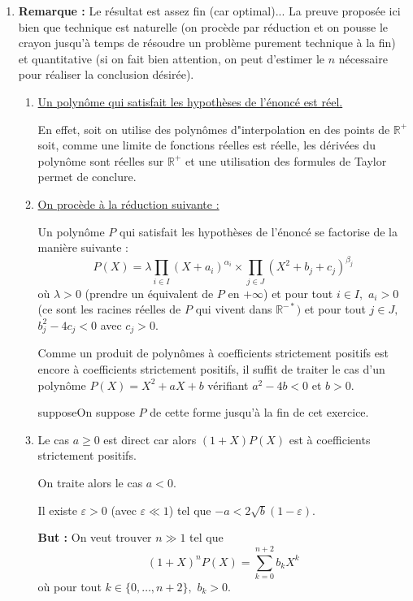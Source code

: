 \begin{enumerate}
 
\item \textbf{Remarque :} Le résultat est assez fin (car optimal)... La preuve proposée ici bien que technique est naturelle (on procède par réduction et on pousse le crayon jusqu'à temps de résoudre un problème purement technique à la fin) et quantitative (si on fait bien attention, on peut d'estimer le $n$ nécessaire pour réaliser la conclusion désirée).\\

\begin{enumerate}
\item \underline{Un polynôme qui satisfait les hypothèses de l'énoncé est réel.}
    
En effet, soit on utilise des polynômes d"interpolation en des points de $\mathbb{R}^{+}$ soit, comme une limite de fonctions réelles est réelle, les dérivées du polynôme sont réelles sur $\mathbb{R}^{+}$ et une utilisation des formules de Taylor permet de conclure.

\item \underline{On procède à la réduction suivante :}

Un polynôme $P$ qui satisfait les hypothèses de l'énoncé se factorise de la  manière suivante : 
$$P(X)=\lambda\prod_{i\in I}(X+a_{i})^{\alpha_{i}}\times \prod_{j\in J}(X^{2}+b_{j}+c_{j})^{\beta_{j}}$$ 
où $\lambda>0$ (prendre un équivalent de $P$ en $+\infty$) et pour tout $i\in I,$ $a_{i}>0$ (ce sont les racines réelles de $P$ qui vivent dans $\mathbb{R}^{-*})$ et pour tout $j\in J,$ $b_{j}^{2}-4c_{j}<0$ avec $c_{j}>0.$

Comme un produit de polynômes à coefficients strictement positifs est encore à coefficients strictement positifs, il suffit de traiter le cas d'un polynôme $P(X)=X^{2}+aX+b$ vérifiant $a^{2}-4b<0$ et $b>0.$

supposeOn suppose $P$ de cette forme jusqu'à la fin de cet exercice.

\item Le cas $a\geq 0$ est direct car alors $(1+X)P(X)$ est à coefficients strictement positifs.

On traite alors le cas $a<0.$

Il existe $\varepsilon>0$ (avec $\varepsilon\ll 1$) tel que $-a<2\sqrt{b}(1-\varepsilon).$

\textbf{But :} On veut trouver $n\gg 1$ tel que $$(1+X)^{n}P(X)=\sum_{k=0}^{n+2}b_{k}X^{k}$$ où pour tout  $k\in\{0,\ldots,n+2\},$ $b_{k}>0.$


\end{enumerate}
\end{enumerate}
